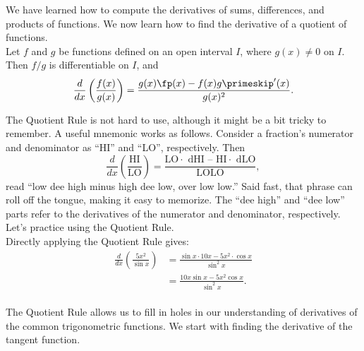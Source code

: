 We have learned how to compute the derivatives of sums, differences, and products of functions. We now learn how to find the derivative of a quotient of functions.\\

{Let $f$ and $g$ be functions defined on an open interval $I$, where $g(x) \neq 0$ on $I$. Then $f/g$ is differentiable on $I$, and $$\frac{d}{dx}\left(\frac{f(x)}{g(x)}\right) = \frac{g(x)\fp(x) - f(x)g\primeskip'(x)}{g(x)^2}.$$
}

The Quotient Rule is not hard to use, although it might be a bit tricky to remember. A useful mnemonic works as follows. Consider a fraction's numerator and denominator as ``HI'' and ``LO'', respectively. Then $$\frac{d}{dx}\left(\frac{\text{HI}}{\text{LO}}\right) = \frac{\text{LO$\cdot$ dHI -- HI$\cdot$ dLO}}{\text{LOLO}},$$ read ``low dee high minus high dee low, over low low.'' Said fast, that phrase can roll off the tongue, making it easy to memorize. The ``dee high'' and ``dee low'' parts refer to the derivatives of the numerator and denominator, respectively.\\

Let's practice using the Quotient Rule.\\

{Directly applying the Quotient Rule gives:
	\begin{align*}
	\frac{d}{dx}\left(\frac{5x^2}{\sin x}\right) &= \frac{\sin x\cdot 10x - 5x^2\cdot \cos x}{\sin^2x} \\
																		&=	\frac{10x\sin x - 5x^2\cos x}{\sin^2 x}.
	\end{align*}
\baselineskip
}\\

The Quotient Rule allows us to fill in holes in our understanding of derivatives of the common trigonometric functions. We start with finding the derivative of the tangent function.\\

